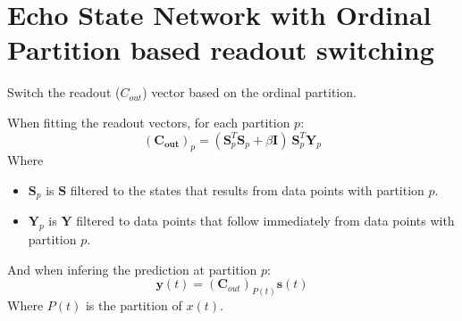 
\chapter{Echo State Network with Ordinal Partition based readout switching}


Switch the readout ($C_{out}$) vector based on the ordinal partition.

When fitting the readout vectors, for each partition $p$:
\[
    (\mathbf{C_{out}})_p = (\mathbf{S}_p^T \mathbf{S}_p + \beta \mathbf{I}) \ \mathbf{S}_p^T \mathbf{Y}_p
\]
Where
\begin{itemize}
    \item $\mathbf{S}_p$ is $\mathbf{S}$ filtered to the states that results from data points with partition $p$. 
    \item $\mathbf{Y}_{p}$ is $\mathbf{Y}$ filtered to data points that follow immediately from data points with partition $p$.
\end{itemize}
And when infering the prediction at partition $p$:
\[
    \mathbf{y}(t) = (\mathbf{C}_{out})_{P(t)}\mathbf{s}(t)
\]
Where $P(t)$ is the partition of $x(t)$.

